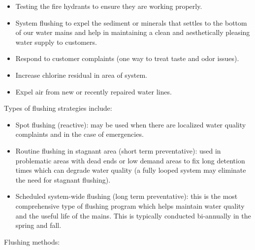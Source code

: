\documentclass[10pt]{article}
\begin{document}
\begin{itemize}
  \item Testing the fire hydrants to ensure they are working properly.

  \item System flushing to expel the sediment or minerals that settles to the bottom of our water mains and help in maintaining a clean and aesthetically pleasing water supply to customers.

  \item Respond to customer complaints (one way to treat taste and odor issues).

  \item Increase chlorine residual in area of system.

  \item Expel air from new or recently repaired water lines.

\end{itemize}
Types of flushing strategies include:

\begin{itemize}
  \item Spot flushing (reactive): may be used when there are localized water quality complaints and in the case of emergencies.

  \item Routine flushing in stagnant area (short term preventative): used in problematic areas with dead ends or low demand areas to fix long detention times which can degrade water quality (a fully looped system may eliminate the need for stagnant flushing).

  \item Scheduled system-wide flushing (long term preventative): this is the most comprehensive type of flushing program which helps maintain water quality and the useful life of the mains. This is typically conducted bi-annually in the spring and fall.

\end{itemize}
Flushing methods:
\end{document}
